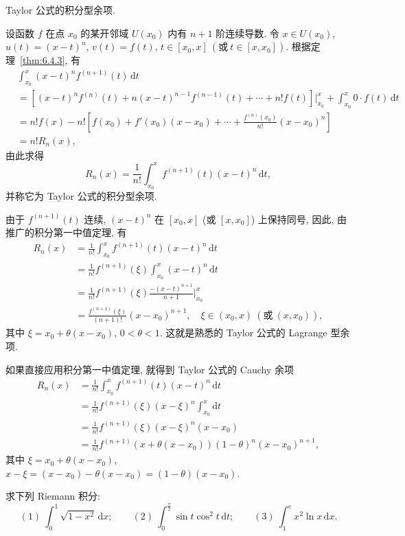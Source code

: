 \begin{example}\label{ex:6.4.1}
Taylor 公式的积分型余项.

设函数 $f$ 在点 $x_{0}$ 的某开邻域 $U(x_{0})$ 内有 $n+1$ 阶连续导数. 令 $x\in U(x_{0})$, $u(t)=(x-t)^{n}$, $v(t)=f(t)$, $t\in[x_{0},x]\ (\text{或}\ t\in[x,x_{0}])$. 根据定理~\ref{thm:6.4.3}, 有
\begin{align*}
&\int_{x_{0}}^{x}(x-t)^{n}f^{(n+1)}(t)\,\mathrm{d}t\\
&=\left[(x-t)^{n}f^{(n)}(t)+n(x-t)^{n-1}f^{(n-1)}(t)+\cdots+n!f(t)\right]\Bigg|_{x_{0}}^{x}+\int_{x_{0}}^{x}0\cdot f(t)\,\mathrm{d}t\\
&=n!f(x)-n!\left[f(x_{0})+f'(x_{0})(x-x_{0})+\cdots+\frac{f^{(n)}(x_{0})}{n!}(x-x_{0})^{n}\right]\\
&=n!R_{n}(x),
\end{align*}
由此求得
\[
R_{n}(x)=\frac{1}{n!}\int_{x_{0}}^{x}f^{(n+1)}(t)(x-t)^{n}\,\mathrm{d}t,
\]
并称它为 Taylor 公式的积分型余项.

由于 $f^{(n+1)}(t)$ 连续, $(x-t)^{n}$ 在 $[x_{0},x]$ (或 $[x,x_{0}]$) 上保持同号, 因此, 由推广的积分第一中值定理, 有
\begin{align*}
R_{n}(x)&=\frac{1}{n!}\int_{x_{0}}^{x}f^{(n+1)}(t)(x-t)^{n}\,\mathrm{d}t\\
&=\frac{1}{n!}f^{(n+1)}(\xi)\int_{x_{0}}^{x}(x-t)^{n}\,\mathrm{d}t\\
&=\frac{1}{n!}f^{(n+1)}(\xi)\frac{-(x-t)^{n+1}}{n+1}\Bigg|_{x_{0}}^{x}\\
&=\frac{f^{(n+1)}(\xi)}{(n+1)!}(x-x_{0})^{n+1},\quad\xi\in(x_{0},x)\ (\text{或}\ (x,x_{0})),
\end{align*}
其中 $\xi=x_{0}+\theta(x-x_{0})$, $0<\theta<1$. 这就是熟悉的 Taylor 公式的 Lagrange 型余项.

如果直接应用积分第一中值定理, 就得到 Taylor 公式的 Cauchy 余项
\begin{align*}
R_{n}(x)&=\frac{1}{n!}\int_{x_{0}}^{x}f^{(n+1)}(t)(x-t)^{n}\,\mathrm{d}t\\
&=\frac{1}{n!}f^{(n+1)}(\xi)(x-\xi)^{n}\int_{x_{0}}^{x}\mathrm{d}t\\
&=\frac{1}{n!}f^{(n+1)}(\xi)(x-\xi)^{n}(x-x_{0})\\
&=\frac{1}{n!}f^{(n+1)}(x+\theta(x-x_{0}))(1-\theta)^{n}(x-x_{0})^{n+1},
\end{align*}
其中 $\xi=x_{0}+\theta(x-x_{0})$, $x-\xi=(x-x_{0})-\theta(x-x_{0})=(1-\theta)(x-x_{0})$.
\end{example}

\begin{example}\label{ex:6.4.2}
求下列 Riemann 积分:
\[
(1)\ \int_{0}^{1}\sqrt{1-x^{2}}\,\mathrm{d}x;\qquad(2)\ \int_{0}^{\frac{\pi}{2}}\sin t\cos^{2}t\,\mathrm{d}t;\qquad(3)\ \int_{1}^{\mathrm{e}}x^{2}\ln x\,\mathrm{d}x.
\]
\end{example}

